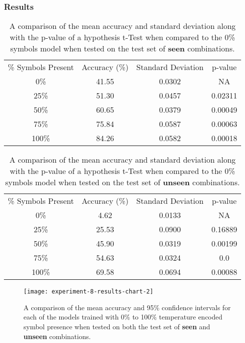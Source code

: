 \subsubsection{Results}

\begin{table}[p]
	\center
	\caption{A comparison of the mean accuracy and standard deviation along with the p-value of a hypothesis t-Test when compared to the 0\% symbols model when tested on the test set of \textbf{seen} combinations.}
	\label{tab:experiment-8-results-table-seen}
	\begin{tabular}{ |c|c|c|c| } 
		\hline
		\% Symbols Present & Accuracy (\%) & Standard Deviation  & p-value\\ 
		0\% & 41.55 & 0.0302 & NA \\  
		25\% & 51.30 & 0.0457 & 0.02311\\  
		50\% & 60.65 & 0.0379 & 0.00049 \\  
		75\% & 75.84 & 0.0587 & 0.00063\\  
		100\% & 84.26 & 0.0582 & 0.00018\\  
		\hline
	\end{tabular}
\end{table}

\begin{table}[p]
	\center
	\caption{A comparison of the mean accuracy and standard deviation along with the p-value of a hypothesis t-Test when compared to the 0\% symbols model when tested on the test set of \textbf{unseen} combinations.}
	\label{tab:experiment-8-results-table-unseen}
	\begin{tabular}{ |c|c|c|c| } 
		\hline
		\% Symbols Present & Accuracy (\%) & Standard Deviation  & p-value\\ 
		0\% & 4.62 & 0.0133 & NA \\  
		25\% & 25.53 & 0.0900 & 0.16889\\  
		50\% & 45.90 & 0.0319 & 0.00199 \\  
		75\% & 54.63 & 0.0324 & 0.0\\  
		100\% & 69.58 & 0.0694 & 0.00088\\  
		\hline
	\end{tabular}
\end{table}

\begin{figure}[p]
	\centering
	\texttt{[image: experiment-8-results-chart-2]}
	\caption{A comparison of the mean accuracy and 95\% confidence intervals for each of the models trained with 0\% to 100\% temperature encoded symbol presence when tested on both the test set of \textbf{seen} and \textbf{unseen} combinations.}
	\label{fig:experiment-8-results-chart}
\end{figure}

